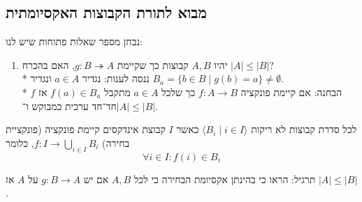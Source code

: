 \subsection{מבוא לתורת הקבוצות האקסיומתית}
נבחן מספר שאלות פתוחות שיש לנו:
\begin{enumerate}
	\item יהיו $A, B$ קבוצות כך שקיימת $g : B \twoheadrightarrow A$, האם בהכרח $|A| \le |B|$? \\*
		ננסה לענות: נגדיר $a \in A$ ונגדיר $B_a = \{ b \in B \mid g(b) = a \} \ne \emptyset$. \\*
		הבחנה: אם קיימת פונקציה $f : A \to B$ כך שלכל $a \in A$ מתקבל $f(a) \in B_a$ אז $f$ חד־חד ערכית כמבוקש ו־$|A| \le |B|$.
\end{enumerate}
\begin{definition}
	לכל סדרת קבוצות לא ריקות $\langle B_i \mid i \in I \rangle$ כאשר $I$ קבוצת אינדקסים קיימת פונקציה (פונקציית בחירה) $f : I \to \bigcup_{i \in I} B_i$, כלומר
	\[
		\forall i \in I : f(i) \in B_i
	\]
\end{definition}
תרגיל:
הראו כי בהינתן אקסיומת הבחירה כי לכל $A, B$ אם יש $g : B \to A$ על $A$ אז $|A| \le |B|$.


